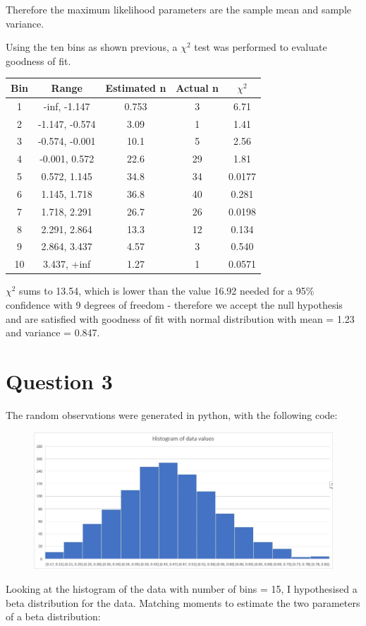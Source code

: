 \documentclass[10pt,a4paper]{article}
\begin{document}
Therefore the maximum likelihood parameters are the sample mean and sample variance.

Using the ten bins as shown previous, a \(\chi^2\) test was performed to evaluate goodness of fit.
\begin{table} [H]
	\centering
	\begin{tabular}{c|c|c|c|c} 
		Bin	&  Range & Estimated n & Actual n & \(\chi^2\)\\ 
		\hline 
		1	&  -inf, -1.147 & 0.753 & 3 & 6.71\\  
		2	&  -1.147, -0.574 & 3.09 & 1 & 1.41\\ 
		3	&  -0.574, -0.001 & 10.1 & 5 & 2.56\\ 
		4	&  -0.001, 0.572 & 22.6 & 29 & 1.81\\ 
		5	&  0.572, 1.145 & 34.8 & 34 & 0.0177\\ 
		6	&  1.145, 1.718 & 36.8 & 40 & 0.281\\ 
		7	&  1.718, 2.291 & 26.7 & 26 & 0.0198\\ 
		8	&  2.291, 2.864 & 13.3 & 12 & 0.134\\ 
		9	&  2.864, 3.437 & 4.57 & 3 & 0.540\\ 
		10	&  3.437, +inf & 1.27 & 1 & 0.0571\\ 
	\end{tabular} 
\end{table}

\(\chi^2\) sums to 13.54, which is lower than the value 16.92 needed for a 95\% confidence with 9 degrees of freedom - therefore we accept the null hypothesis and are satisfied with goodness of fit with normal distribution with mean = 1.23 and variance = 0.847.

\newpage
\section*{Question 3}
The random observations were generated in python, with the following code: \\


\begin{figure}[H]
	\centering
	\includegraphics[width=0.7\linewidth]{q3hist}
\end{figure}
Looking at the histogram of the data with number of bins = 15, I hypothesised a beta distribution for the data. Matching moments to estimate the two parameters of a beta distribution:
\end{document}

